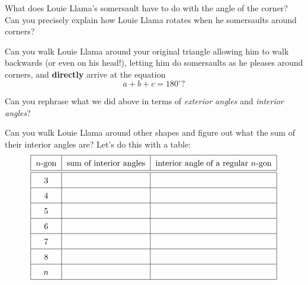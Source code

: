 \begin{prob} 
What does Louie Llama's somersault have to do with the angle of the
corner? Can you precisely explain how Louie Llama rotates when he
somersaults around corners?
\end{prob}


\begin{prob}
Can you walk Louie Llama around your original triangle allowing him to
walk backwards (or even on his head!), letting him do somersaults as
he pleases around corners, and \textbf{directly} arrive at the
equation
\[
a + b + c = 180^\circ?
\]
\end{prob}

\begin{prob} 
Can you rephrase what we did above in terms of \textit{exterior angles} and \textit{interior angles}?
\end{prob}

\break

\begin{prob} 
Can you walk Louie Llama around other shapes and figure out what the
sum of their interior angles are? Let's do this with a table:
\[
{\renewcommand{\arraystretch}{1.5}
\begin{tabular}{|c|c|c|}\hline
$n$-gon & sum of interior angles & interior angle of a regular $n$-gon\\\hline\hline
3 & & \\\hline
4 & & \\\hline
5 & & \\\hline
6 & & \\\hline
7 & & \\\hline
8 & & \\\hline
$n$ & & \\\hline
\end{tabular}}
\]
\end{prob}

